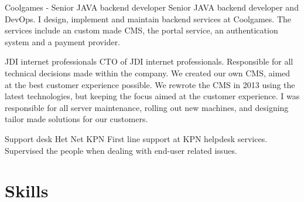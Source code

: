 \documentclass[11pt,a4paper]{moderncv}
\begin{document}
\vspace*{0.2\baselineskip}
{Coolgames - Senior JAVA backend developer }
{}
{}
{}
{
Senior JAVA backend developer and DevOps.
I design, implement and maintain backend services at Coolgames.
The services include an custom made CMS, the portal service,
an authentication system and a payment provider.
}

\vspace*{0.2\baselineskip}
{JDI internet professionals}
{}
{}
{}
{
CTO of JDI internet professionals. Responsible for all technical decisions
made within the company.
We created our own CMS, aimed at the best customer experience possible. We
rewrote the CMS in 2013 using the latest technologies, but keeping the focus
aimed at the customer experience.
I was responsible for all server maintenance, rolling out new machines,
and designing tailor made solutions for our customers.
}

\vspace*{0.2\baselineskip}
{Support desk Het Net}
{KPN}
{}
{}
{
First line support at KPN helpdesk services. Supervised the people when dealing
with end-user related issues.
}

\section{Skills}



\end{document}

